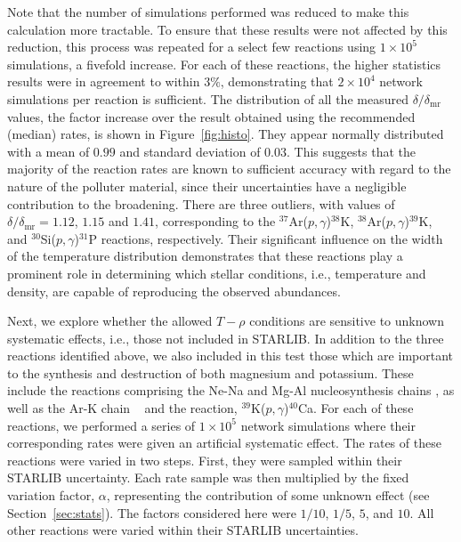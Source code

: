 \documentclass[twocolumn]{aastex6}
\newcommand{\nuclei}[2]{$^{#1}${#2}}
\newcommand{\pgreaction}[4]{\nuclei{#1}{#2}($p,\gamma$)\nuclei{#3}{#4}}
\begin{document}
Note that the number of simulations performed was reduced to make this calculation more tractable.
To ensure that these results were not affected by this reduction, this process was repeated for a select few reactions using $1 \times 10^5$ simulations, a fivefold increase. For each of these reactions, the higher statistics results were in agreement to within $3\%$, demonstrating that $2 \times 10^4$ network simulations per reaction is sufficient.
The distribution of all the measured $\delta/\delta_{\text{mr}}$ values, the factor increase over the result obtained using the recommended (median) rates, is shown in Figure~\ref{fig:histo}. 
They appear normally distributed with a mean of $0.99$ and standard deviation of $0.03$. This suggests that the majority of the reaction rates are known to sufficient accuracy with regard to the nature of the polluter material, since their uncertainties have a negligible contribution to the broadening.
There are three outliers, with values of $\delta/\delta_{\text{mr}}=1.12$, $1.15$ and $1.41$, corresponding to the \pgreaction{37}{Ar}{38}{K},  \pgreaction{38}{Ar}{39}{K}, and \pgreaction{30}{Si}{31}{P} reactions, respectively. Their significant influence on the width of the temperature distribution demonstrates that these reactions play a prominent role in determining which stellar conditions, i.e., temperature and density, are capable of reproducing the observed abundances. 
\par
Next, we explore whether the allowed $T-\rho$ conditions are sensitive to unknown systematic effects, i.e., those not included in STARLIB. In addition to the three reactions identified above, we also included in this test those which are important to the synthesis and destruction of both magnesium and potassium. These include the reactions comprising the Ne-Na and Mg-Al nucleosynthesis chains \citep{Rolfs_1988}, as well as the Ar-K chain ~\citep{Iliadis_2016} and the reaction, \pgreaction{39}{K}{40}{Ca}.
For each of these reactions, we performed a series of $1 \times 10^5$ network simulations where their corresponding rates were given an artificial systematic effect.  
The rates of these reactions were varied in two steps. First, they were sampled within their STARLIB uncertainty. 
Each rate sample was then multiplied by the fixed variation factor, $\alpha$, representing the contribution of some unknown effect (see Section~\ref{sec:stats}). 
The factors considered here were $1/10$, $1/5$, $5$, and $10$. 
All other reactions were varied within their STARLIB uncertainties.
\end{document}
